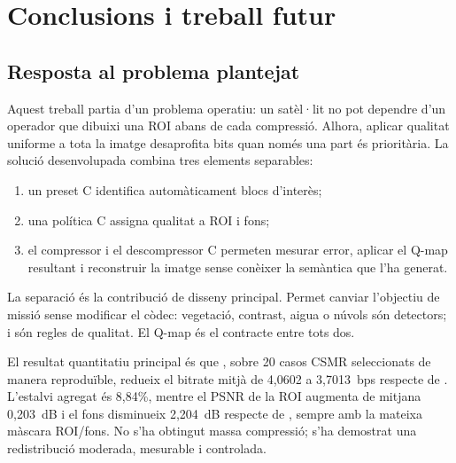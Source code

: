 \chapter{Conclusions i treball futur}\label{ch:conclusions}
\fancyhead[LO]{\slshape \textsf{\nouppercase \rightmark}}

\section{Resposta al problema plantejat}\label{sec:final_answer}

Aquest treball partia d'un problema operatiu: un satèl·lit no pot dependre
d'un operador que dibuixi una ROI abans de cada compressió. Alhora, aplicar
qualitat uniforme a tota la imatge desaprofita bits quan només una part és
prioritària. La solució desenvolupada combina tres elements separables:

\begin{enumerate}[leftmargin=*]
  \item un preset C identifica automàticament blocs d'interès;
	  \item una política C assigna qualitat a ROI i fons;
	  \item el compressor i el descompressor C permeten mesurar error, aplicar el
	  Q-map resultant i reconstruir la imatge sense conèixer la semàntica que l'ha
	  generat.
\end{enumerate}

La separació és la contribució de disseny principal. Permet canviar l'objectiu
de missió sense modificar el còdec: vegetació, contrast, aigua o núvols són
detectors;  i  són regles de qualitat. El Q-map
és el contracte entre tots dos.

El resultat quantitatiu principal és que , sobre 20 casos
CSMR seleccionats de manera reproduïble, redueix el bitrate mitjà de 4,0602 a
3,7013~bps respecte de . L'estalvi agregat és 8,84\%, mentre el PSNR
de la ROI augmenta de mitjana 0,203~dB i el fons disminueix 2,204~dB respecte
de , sempre amb la mateixa màscara ROI/fons. No s'ha obtingut massa
compressió; s'ha demostrat una
redistribució moderada, mesurable i controlada.

